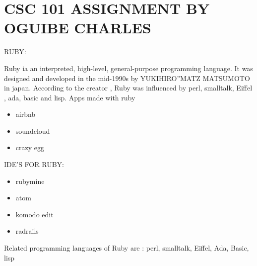 \documentclass{article}
\begin{document}
	\section{CSC 101 ASSIGNMENT BY OGUIBE CHARLES}
	    {RUBY:}
	  
	  Ruby ia an interpreted, high-level, general-purpose programming language. It was designed and developed in the mid-1990s by YUKIHIRO”MATZ MATSUMOTO in japan. According to the creator , Ruby was influenced by perl, smalltalk, Eiffel , ada, basic and lisp.
	  Apps made with ruby
	  \begin{itemize}
	  	\item {airbnb}
	  	\item{soundcloud}
	  	\item{crazy egg}
	  \end{itemize}
     
     {IDE'S FOR RUBY:}
     	  \begin{itemize}
     	  	\item{ rubymine}
     	  	\item{ atom}
     	  	\item{komodo edit}
     	  	\item{ radrails}
     	  \end{itemize}
       
      Related programming languages of Ruby are : perl, smalltalk, Eiffel, Ada, Basic, lisp 
     
\end{document}
